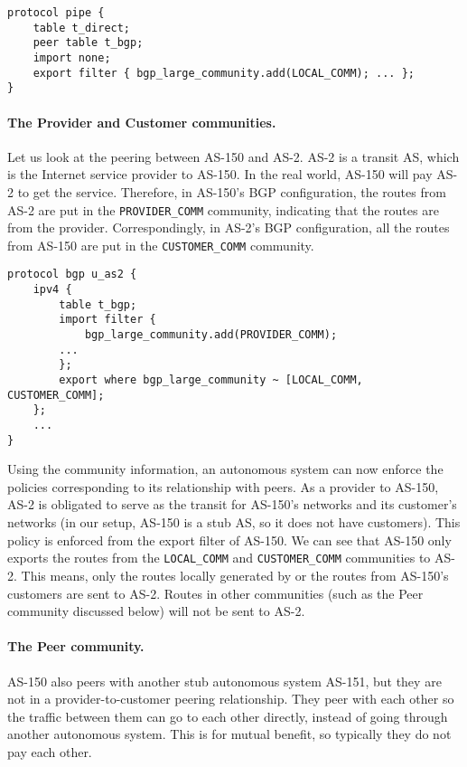 \begin{lstlisting}
protocol pipe {
    table t_direct;
    peer table t_bgp;
    import none;
    export filter { bgp_large_community.add(LOCAL_COMM); ... };
}
\end{lstlisting}


\paragraph{The Provider and Customer communities.}
Let us look at the peering between AS-150 and AS-2. 
AS-2 is a transit AS, which is the Internet service provider 
to AS-150. In the real world, AS-150 will pay AS-2 to get the service. Therefore, 
in AS-150's BGP configuration, the routes from AS-2 are put
in the \texttt{PROVIDER\_COMM} community, indicating that
the routes are from the provider. 
Correspondingly, in AS-2's BGP configuration, all the routes
from AS-150 are put in the \texttt{CUSTOMER\_COMM} community. 

\begin{lstlisting}
protocol bgp u_as2 {
    ipv4 {
        table t_bgp;
        import filter {
            bgp_large_community.add(PROVIDER_COMM);
	    ...
        };
        export where bgp_large_community ~ [LOCAL_COMM, CUSTOMER_COMM];
    };
    ...
}
\end{lstlisting}

Using the community information, an autonomous system
can now enforce the policies corresponding to its relationship with
peers. As a provider to AS-150, AS-2 is obligated to serve as the 
transit for AS-150's networks and its customer's networks (in our setup, 
AS-150 is a stub AS, so it does not have customers). 
This policy is enforced from the export filter of AS-150. We can see
that AS-150 only exports the routes from the 
\texttt{LOCAL\_COMM} and \texttt{CUSTOMER\_COMM} communities to AS-2.
This means, only the routes locally generated by or the routes 
from AS-150's customers are sent to AS-2. Routes in other 
communities (such as the Peer community discussed below)
will not be sent to AS-2.


\paragraph{The Peer community.}
AS-150 also peers with another stub autonomous system AS-151, but they 
are not in a provider-to-customer peering relationship. 
They peer with each other so the traffic between them
can go to each other directly, instead of going through another 
autonomous system. This is for mutual benefit, so
typically they do not pay each other. 

